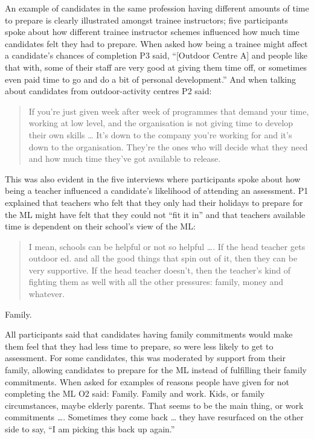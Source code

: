 \documentclass[a4paper,]{book}
\begin{document}
An example of candidates in the same profession having different amounts of time to prepare is clearly illustrated amongst trainee instructors; five participants spoke about how different trainee instructor schemes influenced how much time candidates felt they had to prepare. When asked how being a trainee might affect a candidate's chances of completion P3 said, ``{[}Outdoor Centre A{]} and people like that with, some of their staff are very good at giving them time off, or sometimes even paid time to go and do a bit of personal development.'' And when talking about candidates from outdoor-activity centres P2 said:

\begin{quote}
If you're just given week after week of programmes that demand your time, working at low level, and the organisation is not giving time to develop their own skills \ldots{} It's down to the company you're working for and it's down to the organisation. They're the ones who will decide what they need and how much time they've got available to release.
\end{quote}

This was also evident in the five interviews where participants spoke about how being a teacher influenced a candidate's likelihood of attending an assessment. P1 explained that teachers who felt that they only had their holidays to prepare for the ML might have felt that they could not ``fit it in'' and that teachers available time is dependent on their school's view of the ML:

\begin{quote}
I mean, schools can be helpful or not so helpful \ldots{}. If the head teacher gets outdoor ed. and all the good things that spin out of it, then they can be very supportive. If the head teacher doesn't, then the teacher's kind of fighting them as well with all the other pressures: family, money and whatever.
\end{quote}

Family.

All participants said that candidates having family commitments would make them feel that they had less time to prepare, so were less likely to get to assessment. For some candidates, this was moderated by support from their family, allowing candidates to prepare for the ML instead of fulfilling their family commitments. When asked for examples of reasons people have given for not completing the ML O2 said:
Family. Family and work. Kids, or family circumstances, maybe elderly parents. That seems to be the main thing, or work commitments \ldots{}. Sometimes they come back \ldots{} they have resurfaced on the other side to say, ``I am picking this back up again.''
\end{document}
